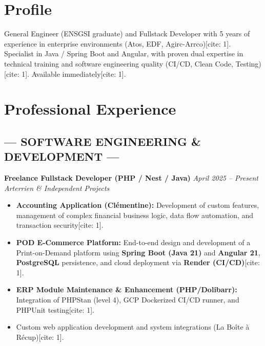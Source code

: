 \documentclass[a4paper,10pt]{article}
\newcommand{\cvtext}{\fontsize{9}{11}\selectfont}
\begin{document}
\begin{minipage}[t]{0.68\textwidth}
\section*{Profile}
General Engineer (ENSGSI graduate) and Fullstack Developer with 5 years of experience in enterprise environments (Atos, EDF, Agirc-Arrco)[cite: 1]. Specialist in Java / Spring Boot and Angular, with proven dual expertise in technical training and software engineering quality (CI/CD, Clean Code, Testing)[cite: 1]. Available immediately[cite: 1].
\vspace{0.8em}

\section*{Professional Experience}
\begin{tcolorbox}[cvbox, width=\linewidth, fontupper=\cvtext]
    \subsection*{--- SOFTWARE ENGINEERING \& DEVELOPMENT ---}
    \vspace{0.3em}

\textcolor{bleu}{\textbf{Freelance Fullstack Developer (PHP / Nest / Java)}} \hfill \textit{April 2025 -- Present}\\
\textit{Arterrien \& Independent Projects}
\begin{itemize}[leftmargin=*]
    \item \textbf{Accounting Application (Clémentine):} Development of custom features, management of complex financial business logic, data flow automation, and transaction security[cite: 1].
    \item \textbf{POD E-Commerce Platform:} End-to-end design and development of a Print-on-Demand platform using \textbf{Spring Boot (Java 21)} and \textbf{Angular 21}, \textbf{PostgreSQL} persistence, and cloud deployment via \textbf{Render (CI/CD)}[cite: 1].
  \item \textbf{ERP Module Maintenance \& Enhancement (PHP/Dolibarr):} Integration of PHPStan (level 4), GCP Dockerized CI/CD runner, and PHPUnit testing[cite: 1].
  \item Custom web application development and system integrations (La Boîte à Récup)[cite: 1].
\end{itemize}
\vspace{0.8em}


\end{tcolorbox}
\end{minipage}
\end{document}
